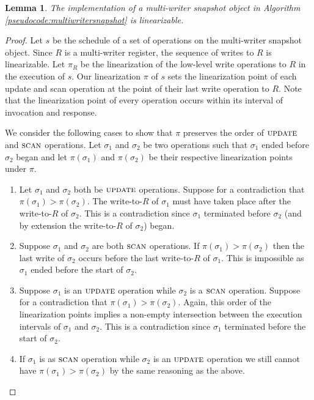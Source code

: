 \documentclass[11pt]{article}
\newcommand\updateF{\textsc{update}}
\newcommand\scanF{\textsc{scan}}
\newtheorem{lemma}[theorem]{Lemma}
\begin{document}
\begin{lemma}
\label{lem:linearization}
The implementation of a multi-writer snapshot object in Algorithm \ref{pseudocode:multiwritersnapshot} is linearizable.
\end{lemma}
\begin{proof}
Let $s$ be the schedule of a set of operations on the multi-writer snapshot object. Since $R$ is a multi-writer register, the sequence of writes to $R$ is linearizable. Let $\pi_R$ be the linearization of the low-level write operations to $R$ in the execution of $s$. Our linearization $\pi$ of $s$ sets the linearization point of each update and scan operation at the point of their last write operation to $R$. Note that the linearization point of every operation occurs within its interval of invocation and response. 

We consider the following cases to show that $\pi$ preserves the order of $\updateF$ and $\scanF$ operations. Let $\sigma_1$ and $\sigma_2$ be two operations such that $\sigma_1$ ended before $\sigma_2$ began and let $\pi(\sigma_1)$ and $\pi(\sigma_2)$ be their respective linearization points under $\pi$.
\begin{enumerate}
\item Let $\sigma_1$ and $\sigma_2$ both be $\updateF$ operations. Suppose for a contradiction that $\pi(\sigma_1) > \pi(\sigma_2)$. The write-to-$R$ of $\sigma_1$ must have taken place after the write-to-$R$ of $\sigma_2$. This is a contradiction since $\sigma_1$ terminated before $\sigma_2$ (and by extension the write-to-$R$ of $\sigma_2$) began. 
\item Suppose $\sigma_1$ and $\sigma_2$ are both $\scanF$ operations. If $\pi(\sigma_1) > \pi(\sigma_2)$ then the last write of $\sigma_2$ occurs before the last write-to-$R$ of $\sigma_1$. This is impossible as $\sigma_1$ ended before the start of $\sigma_2$.
\item Suppose $\sigma_1$ is an $\updateF$ operation while $\sigma_2$ is a $\scanF$ operation. Suppose for a contradiction that $\pi(\sigma_1) > \pi(\sigma_2)$. Again, this order of the linearization points implies a non-empty intersection between the execution intervals of $\sigma_1$ and $\sigma_2$. This is a contradiction since $\sigma_1$ terminated before the start of $\sigma_2$. 
\item If $\sigma_1$ is as $\scanF$ operation while $\sigma_2$ is an $\updateF$ operation we still cannot have $\pi(\sigma_1) > \pi(\sigma_2)$ by the same reasoning as the above.  
\end{enumerate}
\end{proof}
\end{document}
